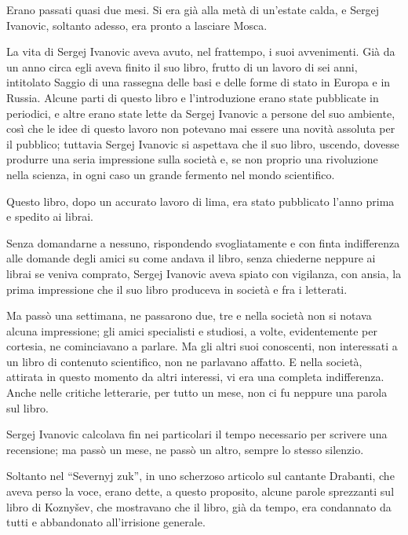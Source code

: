\label{parte-ottava} 
\pagestyle{pagina}

\label{i-7} 

Erano passati quasi due mesi. Si era già alla metà di un'estate calda, e Sergej Ivanovic, soltanto adesso, era pronto a lasciare Mosca. 

La vita di Sergej Ivanovic aveva avuto, nel frattempo, i suoi avvenimenti. Già da un anno circa egli aveva finito il suo libro, frutto di un lavoro di sei anni, intitolato Saggio di una rassegna delle basi e delle forme di stato in Europa e in Russia. Alcune parti di questo libro e l'introduzione erano state pubblicate in periodici, e altre erano state lette da Sergej Ivanovic a persone del suo ambiente, così che le idee di questo lavoro non potevano mai essere una novità assoluta per il pubblico; tuttavia Sergej Ivanovic si aspettava che il suo libro, uscendo, dovesse produrre una seria impressione sulla società e, se non proprio una rivoluzione nella scienza, in ogni caso un grande fermento nel mondo scientifico. 

Questo libro, dopo un accurato lavoro di lima, era stato pubblicato l'anno prima e spedito ai librai. 

Senza domandarne a nessuno, rispondendo svogliatamente e con finta indifferenza alle domande degli amici su come andava il libro, senza chiederne neppure ai librai se veniva comprato, Sergej Ivanovic aveva spiato con vigilanza, con ansia, la prima impressione che il suo libro produceva in società e fra i letterati. 

Ma passò una settimana, ne passarono due, tre e nella società non si notava alcuna impressione; gli amici specialisti e studiosi, a volte, evidentemente per cortesia, ne cominciavano a parlare. Ma gli altri suoi conoscenti, non interessati a un libro di contenuto scientifico, non ne parlavano affatto. E nella società, attirata in questo momento da altri interessi, vi era una completa indifferenza. Anche nelle critiche letterarie, per tutto un mese, non ci fu neppure una parola sul libro. 

Sergej Ivanovic calcolava fin nei particolari il tempo necessario per scrivere una recensione; ma passò un mese, ne passò un altro, sempre lo stesso silenzio. 

Soltanto nel ``Severnyj zuk'', in uno scherzoso articolo sul cantante Drabanti, che aveva perso la voce, erano dette, a questo proposito, alcune parole sprezzanti sul libro di Koznyšev, che mostravano che il libro, già da tempo, era condannato da tutti e abbandonato all'irrisione generale. 

